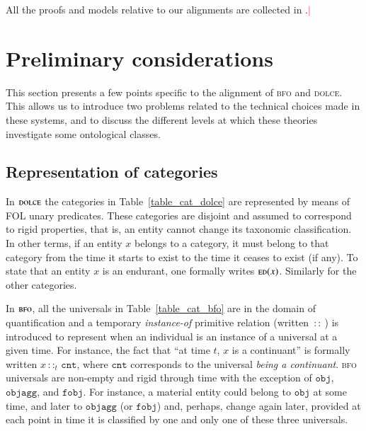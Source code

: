 \documentclass[ao]{iosart2x}
\newcommand{\nb}[1]{\textcolor{red}{$|$}\marginpar{\hspace*{-0cm}\parbox{20mm}{\scriptsize\raggedright\textcolor{red}{#1}}}}
\newcommand{\cn}[1]{\mathtt{#1}}
\newcommand{\dolce}{{\textsc{dolce}}}
\newcommand{\bfo}{{\textsc{bfo}}}
\newcommand {\EDdcat} {\textsc{ed}}
\newcommand{\cntbcat}{\cn{cnt}}
\newcommand{\objbcat}{\cn{obj}}
\newcommand{\fobjbcat}{\cn{fobj}}
\newcommand{\objaggbcat}{\cn{objagg}}
\newcommand{\bfoiof}[1]{{\,::_{#1\:\!}}}
\begin{document}


All the proofs and models relative to our alignments are collected in \citep{??}.\nb{CM: mettere documento, il del o un rapporto}

\section{Preliminary considerations}\label{sect_prelim_considerations}
This section presents a few points specific to the alignment of {\bfo} and {\dolce}. This allows us to introduce two problems related to the technical choices made in these systems, and to discuss the different levels at which these theories investigate some ontological classes. 



\subsection{Representation of categories}\label{sect_problem_univ}

In  {$\dolce$} the categories in  Table~\ref{table_cat_dolce} are represented by means of FOL unary predicates. These categories are disjoint and assumed to correspond to rigid properties, that is, an entity cannot change its taxonomic classification. In other terms, if an entity $x$ belongs to a category, it must belong to that category from the time it starts to exist to the time it ceases to exist (if any). To state that an entity $x$ is an endurant, one formally writes $\EDdcat(x)$. Similarly for the other categories.

In {$\bfo$}, all the universals in Table~\ref{table_cat_bfo} are in the domain of quantification and a temporary \emph{instance-of} primitive relation (written $\bfoiof{}$) is introduced to represent when %
an individual is an instance of a universal at a given time. For instance, the fact that ``at time $t$, $x$ is a continuant'' is formally written $x \bfoiof{t} \cntbcat$, where $\cntbcat$ corresponds to the universal \emph{being a continuant}.
{\bfo} universals are non-empty and rigid through time %
with the exception of $\objbcat$, $\objaggbcat$, and $\fobjbcat$. For instance, a material entity could belong to $\objbcat$ at some time, and later to $\objaggbcat$ (or $\fobjbcat$) and, perhaps, change again later, provided at each point in time it is classified by one and only one of these three universals.
\end{document}

